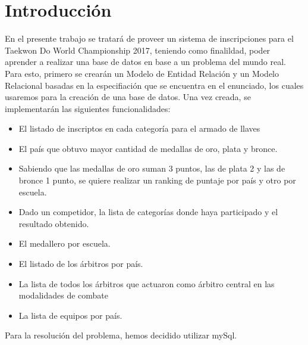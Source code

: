 \section{Introducción}
En el presente trabajo se tratará de proveer un sistema de inscripciones para el Taekwon Do World Championship 2017, teniendo como finalildad, poder aprender a realizar una base de datos en base a un problema del mundo real. Para esto, primero se crearán un Modelo de Entidad Relación y un Modelo Relacional basadas en la especifiación que se encuentra en el enunciado, los cuales usaremos para la creación de una base de datos. Una vez creada, se implementarán las siguientes funcionalidades:

\begin{itemize}
	\item El listado de inscriptos en cada categoría para el armado de llaves
	\item El país que obtuvo mayor cantidad de medallas de oro, plata y bronce.
	\item Sabiendo que las medallas de oro suman 3 puntos, las de plata 2 y las de bronce 1
punto, se quiere realizar un ranking de puntaje por país y otro por escuela.
	\item Dado un competidor, la lista de categorías donde haya participado y el resultado
obtenido.
	\item El medallero por escuela.
	\item El listado de los árbitros por país.
	\item La lista de todos los árbitros que actuaron como árbitro central en las modalidades
de combate
	\item La lista de equipos por país.
\end{itemize}

Para la resolución del problema, hemos decidido utilizar mySql.